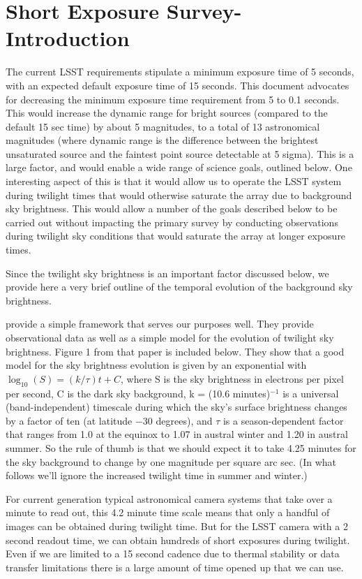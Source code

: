 
\section{Short Exposure Survey- Introduction }

The current LSST requirements stipulate a minimum exposure time of 5 seconds, with an expected default exposure time of 15 seconds. This document advocates for decreasing the minimum exposure time requirement from 5 to 0.1 seconds. This would increase the dynamic range for bright sources (compared to the default 15 sec time) by about 5 magnitudes, to a total of 13 astronomical magnitudes (where dynamic range is the difference between the brightest unsaturated source and the faintest point source detectable at 5 sigma). This is a large factor, and would enable a wide range of science goals, outlined below. One interesting aspect of this is that it would allow us to operate the LSST system during twilight times that would otherwise saturate the array due to background sky brightness. This would allow a number of the goals described below to be carried out without impacting the primary survey by conducting observations during twilight sky conditions that would saturate the array at longer exposure times. 

Since the twilight sky brightness is an important factor discussed below, we provide here a very brief outline of the temporal evolution of the background sky brightness. 

\citet{1993AJ....105.1206T}
provide a simple framework that serves our purposes well. They provide observational data as well as a simple model for the evolution of twilight sky brightness. Figure 1 from that paper is included below. They show that a good model for the sky brightness evolution is given by an exponential with 
$\log_{10}(S)=(k/\tau)t+C$, 
where S is the sky brightness in electrons per pixel per second, C is the dark sky background, k = (10.6 minutes)$^{-1}$  is a universal (band-independent) timescale during which the sky's surface brightness changes by a factor of ten (at latitude $-$30 degrees), and $\tau$ is a season-dependent factor that ranges from 1.0 at the equinox to 1.07 in austral winter and 1.20 in austral summer. So the rule of thumb is that we should expect it to take 4.25 minutes for the sky background to change by one magnitude per square arc sec. (In what follows we'll ignore the increased twilight time in summer and winter.)

For current generation typical astronomical camera systems that take over a minute to read out, this 4.2 minute time scale means that only a handful of images can be obtained during twilight time. But for the LSST camera with a 2 second readout time, we can obtain hundreds of short exposures during twilight. Even if we are limited to a 15 second cadence due to thermal stability or data transfer limitations there is a large amount of time opened up that we can use. 

